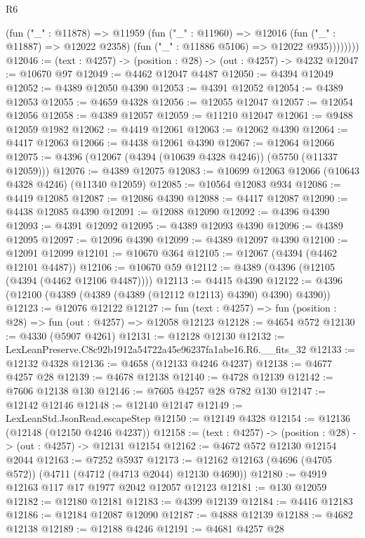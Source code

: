 \begin{lexlean}{R6}
\begin{coremodule}
              (fun ("_" : @11878) =>
              @11959
                (fun ("_" : @11960) =>
                @12016
                  (fun ("_" : @11887) => @12022 @2358)
                  (fun ("_" : @11886 @5106) => @12022 @935))))))))
@12046 := (text : @4257) -> (position : @28) -> (out : @4257) -> @4232
@12047 := @10670 @97
@12049 := @4462 @12047 @4487
@12050 := @4394 @12049
@12052 := @4389 @12050 @4390
@12053 := @4391 @12052
@12054 := @4389 @12053
@12055 := @4659 @4328
@12056 := @12055 @12047
@12057 := @12054 @12056
@12058 := @4389 @12057
@12059 := @11210 @12047
@12061 := @9488 @12059 @1982
@12062 := @4419 @12061
@12063 := @12062 @4390
@12064 := @4417 @12063
@12066 := @4438 @12061 @4390
@12067 := @12064 @12066
@12075 := @4396 (@12067 (@4394 (@10639 @4328 @4246)) (@5750 (@11337 @12059)))
@12076 := @4389 @12075
@12083 := @10699 @12063 @12066 (@10643 @4328 @4246) (@11340 @12059)
@12085 := @10564 @12083 @934
@12086 := @4419 @12085
@12087 := @12086 @4390
@12088 := @4417 @12087
@12090 := @4438 @12085 @4390
@12091 := @12088 @12090
@12092 := @4396 @4390
@12093 := @4391 @12092
@12095 := @4389 @12093 @4390
@12096 := @4389 @12095
@12097 := @12096 @4390
@12099 := @4389 @12097 @4390
@12100 := @12091 @12099
@12101 := @10670 @364
@12105 := @12067 (@4394 (@4462 @12101 @4487))
@12106 := @10670 @59
@12112 := @4389 (@4396 (@12105 (@4394 (@4462 @12106 @4487))))
@12113 := @4415 @4390
@12122 := @4396 (@12100 (@4389 (@4389 (@4389 (@12112 @12113) @4390) @4390) @4390))
@12123 := @12076 @12122
@12127 := fun (text : @4257) => fun (position : @28) => fun (out : @4257) => @12058 @12123
@12128 := @4654 @572
@12130 := @4330 (@5907 @4261)
@12131 := @12128 @12130
@12132 := LexLeanPreserve.C8c92b1912a54722a45e96237fa1abe16.R6.__fits_32
@12133 := @12132 @4328
@12136 := @4658 (@12133 @4246 @4237)
@12138 := @4677 @4257 @28
@12139 := @4678 @12138
@12140 := @4728 @12139
@12142 := @7606 @12138 @130
@12146 := @7605 @4257 @28 @782 @130
@12147 := @12142 @12146
@12148 := @12140 @12147
@12149 := LexLeanStd.JsonRead.escapeStep
@12150 := @12149 @4328
@12154 := @12136 (@12148 (@12150 @4246 @4237))
@12158 := (text : @4257) -> (position : @28) -> (out : @4257) -> @12131 @12154
@12162 := @4672 @572 @12130 @12154 @2044
@12163 := @7252 @5937
@12173 := @12162 @12163 (@4696 (@4705 @572)) (@4711 (@4712 (@4713 @2044) @12130 @4690))
@12180 := @4919 @12163 @117 @17 @1977 @2042 @12057 @12123
@12181 := @130 @12059
@12182 := @12180 @12181
@12183 := @4399 @12139
@12184 := @4416 @12183
@12186 := @12184 @12087 @12090
@12187 := @4888 @12139
@12188 := @4682 @12138
@12189 := @12188 @4246
@12191 := @4681 @4257 @28

\end{coremodule}
\end{lexlean}
